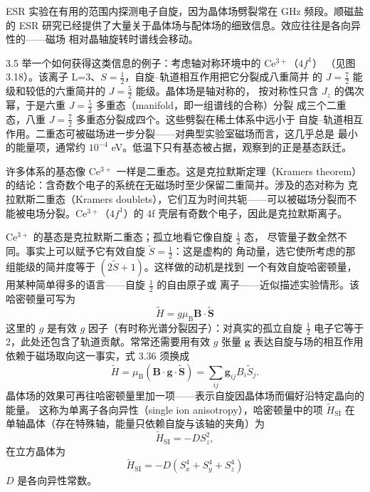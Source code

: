 ESR 实验在有用的范围内探测电子自旋，因为晶体场劈裂常在 GHz 频段。顺磁盐的 ESR
研究已经提供了大量关于晶体场与配体场的细致信息。效应往往是各向异性的——磁场
相对晶轴旋转时谱线会移动。

\begin{example}{3.5}
举一个如何获得这类信息的例子：考虑轴对称环境中的 $\mathrm{Ce^{3+}}$（$4f^{1}$）
（见图 3.18）。该离子 L=3、$S=\frac{1}{2}$，自旋--轨道相互作用把它分裂成八重简并
的 $J=\frac{7}{2}$ 能级和较低的六重简并的 $J=\frac{5}{2}$ 能级。晶体场是轴对称的，
按对称性只含 $J_z$ 的偶次幂，于是六重 $J=\frac{5}{2}$ 多重态（manifold，即一组谱线的合称）分裂
成三个二重态，八重 $J=\frac{7}{2}$ 多重态分裂成四个。这些劈裂在稀土体系中远小于
自旋--轨道相互作用。二重态可被磁场进一步分裂——对典型实验室磁场而言，这几乎总是
最小的能量项，通常约 $10^{-4}$ eV。低温下只有基态被占据，观察到的正是基态跃迁。
\end{example}

许多体系的基态像 $\mathrm{Ce^{3+}}$ 一样是二重态。这是克拉默斯定理（Kramers
theorem）的结论：含奇数个电子的系统在无磁场时至少保留二重简并。涉及的态对称为
克拉默斯二重态（Kramers doublets），它们互为时间共轭——可以被磁场分裂而不能被电场分裂。$\mathrm{Ce^{3+}}$（$4f^{1}$）的 4f 壳层有奇数个电子，因此是克拉默斯离子。

$\mathrm{Ce^{3+}}$ 的基态是克拉默斯二重态；孤立地看它像自旋 $\frac{1}{2}$ 态，
尽管量子数全然不同。事实上可以赋予它有效自旋 $\tilde{S}=\frac{1}{2}$：这是虚构的
角动量，选它使所考虑的那组能级的简并度等于 $(2\tilde{S}+1)$。这样做的动机是找到
一个有效自旋哈密顿量，用某种简单得多的语言——自旋 $\frac{1}{2}$ 的自由原子或
离子——近似描述实验情形。该哈密顿量可写为
\begin{equation*}
\tilde{H} = g\mu_{\mathrm{B}}\mathbf{B}\cdot\tilde{\mathbf{S}}\tag{3.36}
\end{equation*}
这里的 $g$ 是有效 $g$ 因子（有时称光谱分裂因子）：对真实的孤立自旋
$\frac{1}{2}$ 电子它等于 2，此处还包含了轨道贡献。常常还需要用有效 $g$ 张量
$\mathbf{g}$ 表达自旋与场的相互作用依赖于磁场取向这一事实，式 3.36 须换成
\begin{equation*}
\tilde{H} = \mu_{\mathrm{B}}(\mathbf{B}\cdot\mathbf{g}\cdot\tilde{\mathbf{S}}) = \sum_{ij}\mathbf{g}_{ij}B_i\tilde{S}_j.\tag{3.37}
\end{equation*}
晶体场的效果可再往哈密顿量里加一项——表示自旋因晶体场而偏好沿特定晶向的能量。
这称为单离子各向异性（single ion anisotropy），哈密顿量中的项 $\tilde{H}_{\mathrm{SI}}$
在单轴晶体（存在特殊轴，能量只依赖自旋与该轴的夹角）为
\begin{equation*}
\tilde{H}_{\mathrm{SI}} = -DS_z^{2},\tag{3.38}
\end{equation*}
在立方晶体为
\begin{equation*}
\tilde{H}_{\mathrm{SI}} = -D(S_x^{4}+S_y^{4}+S_z^{4})\tag{3.39}
\end{equation*}
$D$ 是各向异性常数。

